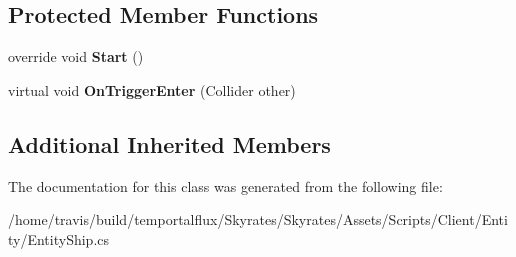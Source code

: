 \subsection*{Protected Member Functions}
\begin{DoxyCompactItemize}
\item 
\hypertarget{class_skyrates_1_1_common_1_1_entity_1_1_entity_ship_a6adfbce73ceafc8178a9a433c8f0f4ed}{override void {\bfseries Start} ()}\label{class_skyrates_1_1_common_1_1_entity_1_1_entity_ship_a6adfbce73ceafc8178a9a433c8f0f4ed}

\item 
\hypertarget{class_skyrates_1_1_common_1_1_entity_1_1_entity_ship_aa0550b01a86006271ca0e8b07623662a}{virtual void {\bfseries On\-Trigger\-Enter} (Collider other)}\label{class_skyrates_1_1_common_1_1_entity_1_1_entity_ship_aa0550b01a86006271ca0e8b07623662a}

\end{DoxyCompactItemize}
\subsection*{Additional Inherited Members}


The documentation for this class was generated from the following file\-:\begin{DoxyCompactItemize}
\item 
/home/travis/build/temportalflux/\-Skyrates/\-Skyrates/\-Assets/\-Scripts/\-Client/\-Entity/Entity\-Ship.\-cs\end{DoxyCompactItemize}
